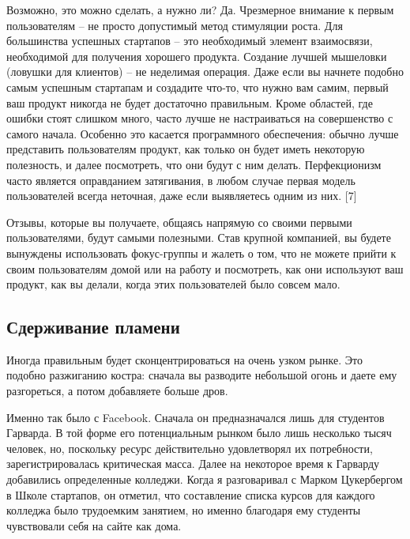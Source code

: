 \documentclass[ebook,12pt,oneside,openany]{memoir}
\begin{document}
Возможно, это можно сделать, а нужно ли? Да. Чрезмерное внимание к
первым пользователям – не просто допустимый метод стимуляции роста.
Для большинства успешных стартапов – это необходимый элемент
взаимосвязи, необходимой для получения хорошего продукта. Создание
лучшей мышеловки (ловушки для клиентов) – не неделимая операция. Даже
если вы начнете подобно самым успешным стартапам и создадите что-то,
что нужно вам самим, первый ваш продукт никогда не будет достаточно
правильным. Кроме областей, где ошибки стоят слишком много, часто
лучше не настраиваться на совершенство с самого начала. Особенно это
касается программного обеспечения: обычно лучше представить
пользователям продукт, как только он будет иметь некоторую полезность,
и далее посмотреть, что они будут с ним делать. Перфекционизм часто
является оправданием затягивания, в любом случае первая модель
пользователей всегда неточная, даже если выявляетесь одним из них. [7]
\newline

Отзывы, которые вы получаете, общаясь напрямую со своими первыми
пользователями, будут самыми полезными. Став крупной компанией, вы
будете вынуждены использовать фокус-группы и жалеть о том, что не
можете прийти к своим пользователям домой или на работу и посмотреть,
как они используют ваш продукт, как вы делали, когда этих
пользователей было совсем мало. \newline

\subsection{Сдерживание пламени}

Иногда правильным будет сконцентрироваться на очень узком рынке. Это
подобно разжиганию костра: сначала вы разводите небольшой огонь и
даете ему разгореться, а потом добавляете больше дров. \newline

Именно так было с Facebook. Сначала он предназначался лишь для
студентов Гарварда. В той форме его потенциальным рынком было лишь
несколько тысяч человек, но, поскольку ресурс действительно
удовлетворял их потребности, зарегистрировалась критическая масса.
Далее на некоторое время к Гарварду добавились определенные колледжи.
Когда я разговаривал с Марком Цукербергом в Школе стартапов, он
отметил, что составление списка курсов для каждого колледжа было
трудоемким занятием, но именно благодаря ему студенты чувствовали себя
на сайте как дома. \newline
\end{document}
